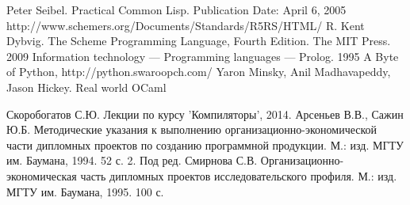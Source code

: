 \begin{thebibliography}{0}
    Peter Seibel. Practical Common Lisp. Publication Date: April 6, 2005
    http://www.schemers.org/Documents/Standards/R5RS/HTML/
    R. Kent Dybvig. The Scheme Programming Language, Fourth Edition. The MIT Press. 2009
    Information technology — Programming languages — Prolog. 1995
    A Byte of Python, http://python.swaroopch.com/
    Yaron Minsky, Anil Madhavapeddy, Jason Hickey. Real world OCaml
    
     Скоробогатов С.Ю. Лекции по курсу 'Компиляторы', 2014.
     Арсеньев В.В., Сажин Ю.Б. Методические указания к выполнению организационно-экономической части дипломных проектов по созданию программной продукции. М.: изд. МГТУ им. Баумана, 1994. 52 с. 2.
     Под ред. Смирнова С.В. Организационно-экономическая часть дипломных проектов исследовательского профиля. М.: изд. МГТУ им. Баумана, 1995. 100 с.
\end{thebibliography}
